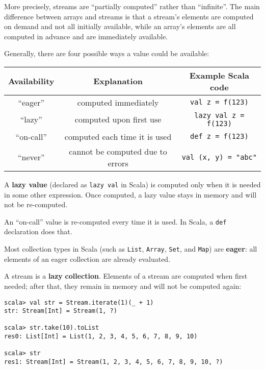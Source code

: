More precisely, streams are \textsf{``}partially computed\textsf{''} rather than \textsf{``}infinite\textsf{''}.
The main difference between arrays and streams is that a stream\textsf{'}s
elements are computed on demand and not all initially available, while
an array\textsf{'}s elements are all computed in advance and are immediately
available.

Generally, there are four possible ways a value could be available:
\begin{center}
\begin{tabular}{|c|c|c|}
\hline 
\textbf{\small{}Availability} & \textbf{\small{}Explanation} & \textbf{\small{}Example Scala code}\tabularnewline
\hline 
\hline 
{\small{}\textsf{``}eager\index{eager value}\textsf{''}} & {\small{}computed immediately} & {\small{}}\lstinline!val z = f(123)!\tabularnewline
\hline 
{\small{}\textsf{``}lazy\textsf{''}} & {\small{}computed upon first use} & {\small{}}\lstinline!lazy val z = f(123)!\tabularnewline
\hline 
{\small{}\textsf{``}on-call\textsf{''}} & {\small{}computed each time it is used} & {\small{}}\lstinline!def z = f(123)!\tabularnewline
\hline 
{\small{}\textsf{``}never\textsf{''}} & {\small{}cannot be computed due to errors} & {\small{}}\lstinline!val (x, y) = "abc" !\tabularnewline
\hline 
\end{tabular}
\par\end{center}

A \textbf{lazy value} (declared as \lstinline!lazy val!
in Scala) is computed only when it is needed in some other expression.
Once computed, a lazy value stays in memory and will not be re-computed.

An \textsf{``}on-call\textsf{''} value is re-computed every
time it is used. In Scala, a \lstinline!def! declaration does that.

Most collection types in Scala (such as \lstinline!List!, \lstinline!Array!,
\lstinline!Set!, and \lstinline!Map!) are \textbf{eager}:
all elements of an eager collection are already evaluated.

A stream is a \textbf{lazy} \textbf{collection}.
Elements of a stream are computed when first needed; after that, they
remain in memory and will not be computed again:
\begin{lstlisting}
scala> val str = Stream.iterate(1)(_ + 1)
str: Stream[Int] = Stream(1, ?)

scala> str.take(10).toList
res0: List[Int] = List(1, 2, 3, 4, 5, 6, 7, 8, 9, 10)

scala> str
res1: Stream[Int] = Stream(1, 2, 3, 4, 5, 6, 7, 8, 9, 10, ?)
\end{lstlisting}

